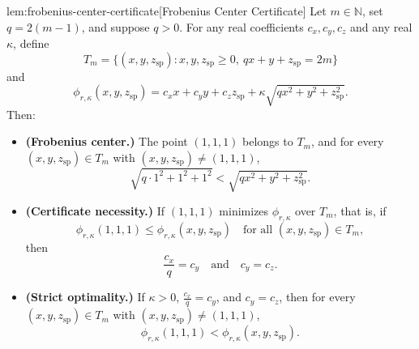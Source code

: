 \documentclass[11pt]{article}
\begin{document}
\begin{lemmav}{lem:frobenius-center-certificate}[Frobenius Center Certificate]
Let \(m\in\mathbb N\), set \(q=2(m-1)\), and suppose \(q>0\).  For any real coefficients \(c_x,c_y,c_z\) and any real \(\kappa\), define
\[
T_m=\{(x,y,z_{\mathrm{sp}}): x,y,z_{\mathrm{sp}}\ge 0,\ qx+y+z_{\mathrm{sp}}=2m\}
\]
and
\[
\phi_{r,\kappa}(x,y,z_{\mathrm{sp}})
=
c_xx+c_yy+c_zz_{\mathrm{sp}}
+\kappa\sqrt{q x^2+y^2+z_{\mathrm{sp}}^2}.
\]
Then:
\begin{itemize}
\item \textbf{(Frobenius center.)} The point \((1,1,1)\) belongs to \(T_m\), and for every \((x,y,z_{\mathrm{sp}})\in T_m\) with \((x,y,z_{\mathrm{sp}})\ne(1,1,1)\),
\[
\sqrt{q\cdot 1^2+1^2+1^2}
<
\sqrt{q x^2+y^2+z_{\mathrm{sp}}^2}.
\]
\item \textbf{(Certificate necessity.)} If \((1,1,1)\) minimizes \(\phi_{r,\kappa}\) over \(T_m\), that is, if
\[
\phi_{r,\kappa}(1,1,1)\le
\phi_{r,\kappa}(x,y,z_{\mathrm{sp}})
\quad\text{for all }(x,y,z_{\mathrm{sp}})\in T_m,
\]
then
\[
\frac{c_x}{q}=c_y
\quad\text{and}\quad
c_y=c_z.
\]
\item \textbf{(Strict optimality.)} If \(\kappa>0\), \(\frac{c_x}{q}=c_y\), and \(c_y=c_z\), then for every \((x,y,z_{\mathrm{sp}})\in T_m\) with \((x,y,z_{\mathrm{sp}})\ne(1,1,1)\),
\[
\phi_{r,\kappa}(1,1,1)
<
\phi_{r,\kappa}(x,y,z_{\mathrm{sp}}).
\]
\end{itemize}
\end{lemmav}
\end{document}
